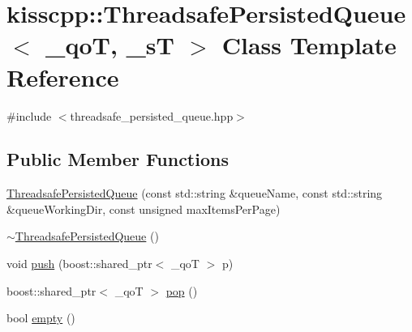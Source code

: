\hypertarget{classkisscpp_1_1_threadsafe_persisted_queue}{\section{kisscpp\-:\-:Threadsafe\-Persisted\-Queue$<$ \-\_\-qo\-T, \-\_\-s\-T $>$ Class Template Reference}
\label{classkisscpp_1_1_threadsafe_persisted_queue}
}


{\ttfamily \#include $<$threadsafe\-\_\-persisted\-\_\-queue.\-hpp$>$}

\subsection*{Public Member Functions}
\begin{DoxyCompactItemize}
\item 
\hyperlink{classkisscpp_1_1_threadsafe_persisted_queue_a97cf702d8b42b4c8fe0b5322dd400778}{Threadsafe\-Persisted\-Queue} (const std\-::string \&queue\-Name, const std\-::string \&queue\-Working\-Dir, const unsigned max\-Items\-Per\-Page)
\item 
\hyperlink{classkisscpp_1_1_threadsafe_persisted_queue_aa5501a8a59b8c72d9684c4c956cd1de8}{$\sim$\-Threadsafe\-Persisted\-Queue} ()
\item 
void \hyperlink{classkisscpp_1_1_threadsafe_persisted_queue_ab4be3f974ebbad4fe5ca9c567b0a7de4}{push} (boost\-::shared\-\_\-ptr$<$ \-\_\-qo\-T $>$ p)
\item 
boost\-::shared\-\_\-ptr$<$ \-\_\-qo\-T $>$ \hyperlink{classkisscpp_1_1_threadsafe_persisted_queue_ac641d52fdd2c291f1ae4799e09ef8933}{pop} ()
\item 
bool \hyperlink{classkisscpp_1_1_threadsafe_persisted_queue_a5acc045d1b5650aab56b1ea33372f007}{empty} ()
\end{DoxyCompactItemize}


